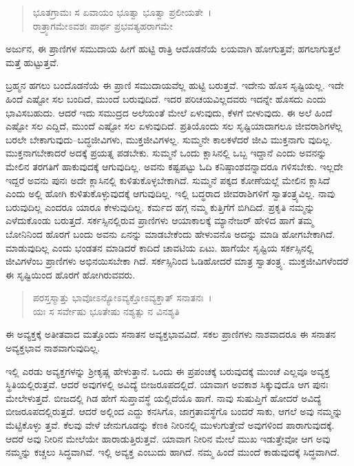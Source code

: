 \begin{verse}
ಭೂತಗ್ರಾಮಃ ಸ ಏವಾಯಂ ಭೂತ್ವಾ ಭೂತ್ವಾ ಪ್ರಲೀಯತೇ~।\\ರಾತ್ರ್ಯಾಗಮೇಽವಶಃ ಪಾರ್ಥ ಪ್ರಭವತ್ಯಹರಾಗಮೇ 
\end{verse}

{\small ಅರ್ಜುನ, ಈ ಪ್ರಾಣಿಗಳ ಸಮುದಾಯ ಹೀಗೆ ಹುಟ್ಟಿ ರಾತ್ರಿ ಆದೊಡನೆಯೆ ಲಯವಾಗಿ ಹೋಗುತ್ತವೆ; ಹಗಲಾಗುತ್ತಲೆ ಮತ್ತೆ ಹುಟ್ಟುತ್ತವೆ.}

ಬ್ರಹ್ಮನ ಹಗಲು ಬಂದೊಡನೆಯೆ ಈ ಪ್ರಾಣಿ ಸಮುದಾಯವೆಲ್ಲ ಹುಟ್ಟಿ ಬರುತ್ತವೆ. ಇದೇನು ಹೊಸ ಸೃಷ್ಟಿಯಲ್ಲ. ಇದೇ ಹಿಂದೆ ಎಷ್ಟೋ ಸಲ ಬಂದಿದೆ, ಮುಂದೆ ಬರುವುದಿದೆ. ಇದರ ಪರಿಚಯವಿಲ್ಲದವರು ಇದನ್ನೇ ಹೊಸದು ಎಂದು ಭಾವಿಸಬಹುದು. ಆದರೆ ಇದು ಸಮುದ್ರದ ಅಲೆಯಂತೆ ಮೇಲೆ ಏಳುವುದು, ಕೆಳಗೆ ಬೀಳುವುದು. ಈ ಅಲೆ ಹಿಂದೆ ಎಷ್ಟೋ ಸಲ ಎದ್ದಿದೆ, ಮುಂದೆ ಎಷ್ಟೋ ಸಲ ಏಳುವುದಿದೆ. ಪ್ರತಿಯೊಂದು ಸಲ ಸೃಷ್ಟಿಯಾದಾಗಲೂ ಜೀವರಾಶಿಗಳೆಲ್ಲ ಬರಲೇ ಬೇಕಾಗುವುದು–ಬದ್ಧಜೀವಿಗಳು, ಮುಕ್ತಜೀವಿಗಳಲ್ಲ. ಸುಮ್ಮನೇ ಕಾಲಕಳೆದರೆ ಜೀವಿ ಮುಕ್ತನಾಗು ವುದಿಲ್ಲ. ಮುಕ್ತನಾಗಬೇಕಾದರೆ ಅದಕ್ಕೆ ಪ್ರಯತ್ನ ಪಡಬೇಕು. ಸುಮ್ಮನೆ ಒಂದು ಕ್ಲಾಸಿನಲ್ಲಿ ಒಬ್ಬ ಇದ್ದಾನೆ ಎಂದು ಅವನನ್ನು ಮೇಲಿನ ತರಗತಿಗೆ ಹಾಕುವುದಕ್ಕೆ ಆಗುವುದಿಲ್ಲ. ಅವನು ಕಷ್ಟಪಟ್ಟು ಓದಿ ಕನಿಷ್ಠಾಂಶವನ್ನಾದರೂ ಗಳಿಸಬೇಕು. ಇಲ್ಲದೇ ಇದ್ದರೆ ಅವನು ಪುನಃ ಅದೇ ಕ್ಲಾಸಿನಲ್ಲಿ ಕುಳಿತುಕೊಳ್ಳಬೇಕಾಗಿದೆ. ಸುಮ್ಮನೆ ಪಕ್ಕದ ಕೋಣೆಯಲ್ಲೆ ಮೇಲಿನ ಕ್ಲಾಸಿದೆ ಎಂದು ಅಲ್ಲಿ ಹೋಗಿ ಕುಳಿತುಕೊಳ್ಳುವುದಕ್ಕೆ ಆಗುವುದಿಲ್ಲ. ಇಲ್ಲಿ ಬದ್ಧರಾದ ಜೀವರಾಶಿಗಳಿಗೆ ಸ್ವಾತಂತ್ರ್ಯವಿಲ್ಲ. ನಾವು ಬರುವುದಿಲ್ಲ ಎಂದರೂ ಯಾರೂ ಕೇಳುವುದಿಲ್ಲ. ಕರ್ಮದ ಹಗ್ಗ ನಮ್ಮ ಕುತ್ತಿಗೆಗೆ ಬಿಗಿದಿದೆ. ಪ್ರಕೃತಿ ನಮ್ಮನ್ನು ಎಳೆದುಕೊಂಡು ಬರುತ್ತದೆ. ಸರ್ಕಸ್ಸಿನಲ್ಲಿರುವ ಪ್ರಾಣಿಗಳು ಆಯಾಕಾಲಕ್ಕೆ ಮ್ಯಾನೇಜರ್ ಹೇಳಿದ ಹಾಗೆ ತಮ್ಮ ಬೋನಿನಿಂದ ಹೊರಗೆ ಬಂದು ಅವನು ಏನನ್ನು ಮಾಡಬೇಕೆಂದು ಹೇಳುವನೊ ಅದನ್ನು ಮಾಡಿ ಹೋಗಬೇಕಾಗಿದೆ. ಮಾಡುವುದಿಲ್ಲ ಎಂದು ಭಂಡತನ ಮಾಡಿದರೆ ಕಾದಿದೆ ಚಾವಟಿಯ ಏಟು. ಹಾಗೆಯೇ ಸೃಷ್ಟಿಯ ಸರ್ಕಸ್ಸಿನಲ್ಲಿ ಜೀವಿಗಳೆಂಬ ಪ್ರಾಣಿಗಳು ಅಭಿನಯಿಸಬೇಕಾ ಗಿದೆ. ಸರ್ಕಸ್ಸಿನಿಂದ ಓಡಿಹೋದರೆ ಮಾತ್ರ ಸ್ವಾತಂತ್ರ್ಯ. ಮುಕ್ತಜೀವಿಗಳೆಂದರೆ ಈ ಸೃಷ್ಟಿಯಿಂದ ಹೊರಗೆ ಹೋಗಿರುವವರು.

\begin{verse}
ಪರಸ್ತಸ್ಮಾತ್ತು ಭಾವೋಽನ್ಯೋಽವ್ಯಕ್ತೋಽವ್ಯಕ್ತಾತ್ ಸನಾತನಃ~।\\ಯಃ ಸ ಸರ್ವೇಷು ಭೂತೇಷು ನಶ್ಯತ್ಸು ನ ವಿನಶ್ಯತಿ 
\end{verse}

{\small ಈ ಅವ್ಯಕ್ತಕ್ಕೆ ಅತೀತವಾದ ಮತ್ತೊಂದು ಸನಾತನ ಅವ್ಯಕ್ತಭಾವವಿದೆ. ಸಕಲ ಪ್ರಾಣಿಗಳು ನಾಶವಾದರೂ ಈ ಸನಾತನ ಅವ್ಯಕ್ತಭಾವ ನಾಶವಾಗುವುದಿಲ್ಲ.}

ಇಲ್ಲಿ ಎರಡು ಅವ್ಯಕ್ತಗಳನ್ನು ಶ‍್ರೀಕೃಷ್ಣ ಹೇಳುತ್ತಾನೆ. ಒಂದು ಈ ಪ್ರಪಂಚಕ್ಕೆ ಬರುವುದಕ್ಕೆ ಮುಂಚೆ ಎಲ್ಲವೂ ಅವ್ಯಕ್ತ ಸ್ಥಿತಿಯಲ್ಲಿರುತ್ತವೆ. ಆದರೆ ಅವುಗಳಲ್ಲಿ ಅವಿದ್ಯೆ ಬೀಜರೂಪದಲ್ಲಿದೆ. ಯಾವಾಗ ಅವಕಾಶ ಸಿಕ್ಕುವುದೊ ಆಗ ಪುನಃ ಮೇಲೇಳುತ್ತದೆ. ಬೀಜದಲ್ಲಿ ಗಿಡ ಹೇಗೆ ಸುಪ್ತಾವಸ್ಥೆ ಯಲ್ಲಿದೆಯೊ ಹಾಗೆ. ನಾವು ಸುಷುಪ್ತಿಗೆ ಹೋದರೆ ಅವಿದ್ಯೆ ಬೀಜರೂಪದಲ್ಲಿರುತ್ತದೆ. ಆದರೆ ಅಲ್ಲಿಂದ ಎದ್ದು ಕನಸಿಗೊ, ಜಾಗ್ರತಾವಸ್ಥೆಗೊ ಬಂದರೆ ಸಾಕು, ಆಗಲೆ ಅವು ನಮ್ಮನ್ನು ಮೆಟ್ಟಿಕೊಳ್ಳು ತ್ತವೆ. ಕೆಲವು ವೇಳೆ ಜೇನುಗೂಡನ್ನು ಕೆಣಕಿ ನೀರಿನಲ್ಲಿ ಮುಳುಗುತ್ತೇವೆ ಅವುಗಳಿಂದ ಪಾರಾಗುವುದಕ್ಕೆ. ಆದರೆ ಅವು ನೀರಿನ ಮೇಲೆಯೇ ಹಾರಾಡುತ್ತಿರುತ್ತವೆ. ಯಾವಾಗ ನೀರಿನ ಮೇಲೆ ಮುಖ ಇಡುತ್ತೇವೋ ಆಗ ಅವು ನಮ್ಮನ್ನು ಕಚ್ಚಲು ಸಿದ್ಧವಾಗಿವೆ. ಇಲ್ಲಿ ಅವ್ಯಕ್ತ ಎಂಬುದು ಹಾಗಿದೆ. ನಮ್ಮ ಹಿಂದೆ ಮುಂದೆ ಕಾಡುವುದಕ್ಕೆ ಸಿದ್ಧವಾಗಿದೆ.

